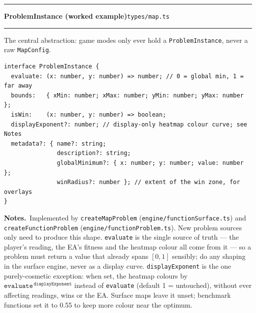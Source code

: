 \documentclass[11pt,a4paper]{report}
\newcommand{\srcfile}[1]{\texttt{\small #1}}   %
\newcommand{\ts}[1]{\texttt{#1}}               %
\newenvironment{apientry}[2]{%
  \par\medskip\noindent
  \begin{minipage}{\textwidth}
  \hrule\vspace{0.6ex}
  {\large\ttfamily\bfseries #1}\hfill{\footnotesize\srcfile{#2}}
  \vspace{0.4ex}\hrule\medskip
}{%
  \end{minipage}\par\medskip
}
\newcommand{\apifield}[1]{\par\smallskip\noindent\textbf{#1.}\ }
\begin{document}
\begin{apientry}{ProblemInstance (worked example)}{types/map.ts}
The central abstraction: game modes only ever hold a \ts{ProblemInstance},
never a raw \ts{MapConfig}.
\begin{lstlisting}
interface ProblemInstance {
  evaluate: (x: number, y: number) => number; // 0 = global min, 1 = far away
  bounds:   { xMin: number; xMax: number; yMin: number; yMax: number };
  isWin:    (x: number, y: number) => boolean;
  displayExponent?: number; // display-only heatmap colour curve; see Notes
  metadata?: { name?: string;
               description?: string;
               globalMinimum?: { x: number; y: number; value: number };
               winRadius?: number }; // extent of the win zone, for overlays
}
\end{lstlisting}
\apifield{Notes}Implemented by \ts{createMapProblem}
(\srcfile{engine/functionSurface.ts}) and \ts{createFunctionProblem}
(\srcfile{engine/functionProblem.ts}). New problem sources only need to
produce this shape. \ts{evaluate} is the single source of truth --- the
player's reading, the EA's fitness and the heatmap colour all come from it
--- so a problem must return a value that already spans $[0,1]$ sensibly;
do any shaping in the surface engine, never as a display curve.
\ts{displayExponent} is the one purely-cosmetic exception: when set, the
heatmap colours by $\ts{evaluate}^{\,\ts{displayExponent}}$ instead of
\ts{evaluate} (default 1 = untouched), without ever affecting readings,
wins or the EA. Surface maps leave it unset; benchmark functions set it to
0.55 to keep more colour near the optimum.
\end{apientry}
\end{document}
